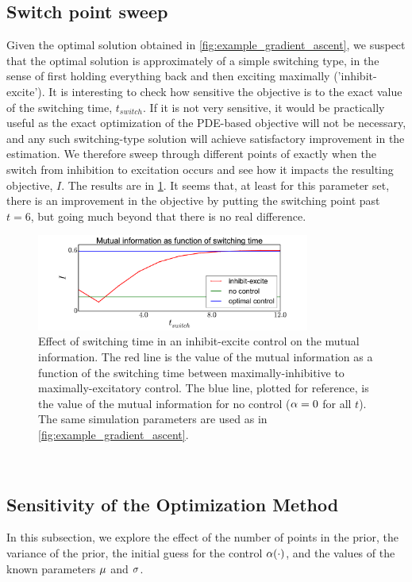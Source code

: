 \subsection{Switch point sweep} 
Given the optimal solution obtained in \cref{fig:example_gradient_ascent}, we suspect
that the optimal solution is approximately of a simple switching type, in the
sense of first holding everything back and then exciting maximally
('inhibit-excite'). It is interesting to check how sensitive the objective
is to the exact value of the switching time, $t_{switch}$. If it is not very sensitive, it would be practically useful as the exact
optimization of the PDE-based objective will not be
necessary, and any such switching-type solution will achieve
satisfactory improvement in the estimation.
We therefore sweep through different points of exactly when the
switch from inhibition to excitation occurs and see how it impacts the resulting
objective, $I$. The results are in \cref{fig:sweep_switchtime}. It seems that, at least for this
parameter set, there is an improvement in the objective by putting the switching
point past $t=6$, but going much beyond that there is no real
difference.

\begin{figure}[htp]
\begin{center}
  \includegraphics[width=0.8\textwidth]{Figs/AdjointOptimizer/SweepSwitchpoint_wide_benchmarked.pdf}
  \caption[Effect of Switching time on Mutual Info Objective]{Effect of 
  switching time in an inhibit-excite control on the mutual
  information. The red line is the value of the mutual information as a function of the switching
  time between maximally-inhibitive to maximally-excitatory control. The blue line, plotted for reference, is the value of the
  mutual information for no control ($\alpha=0$ for all $t$). The same
  simulation parameters are used as in \cref{fig:example_gradient_ascent}. }
  \label{fig:sweep_switchtime}
\end{center}
\end{figure}

\

\subsection{Sensitivity of the Optimization Method} 
In this subsection, we explore the effect of the number of points
in the prior, the variance of the prior, the initial
guess for the control $\alpha(\cdot)$, and the values of the known
parameters ${\mu }$ and $\sigma$. 

